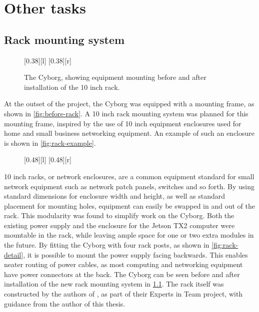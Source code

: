 \documentclass[\rootfolder/main.tex]{subfiles}
\begin{document}
\chapter{Other tasks}

\label{ch:other-tasks} %


\section{Rack mounting system}

\begin{figure}[h]
    \centering
    [0.38\columnwidth][l]{}
    [0.38\columnwidth][r]{}
    \caption{The Cyborg, showing equipment mounting before and after installation of the 10 inch rack.\label{fig:before-after-rack}}
\end{figure}

At the outset of the project, the Cyborg was equipped with a mounting frame, as shown in \cref{fig:before-rack}.
A 10 inch rack mounting system was planned for this mounting frame, inspired by the use of 10 inch equipment enclosures used for home and small business networking equipment.
An example of such an enclosure is shown in \cref{fig:rack-example}.

\begin{figure}[h]
    [0.48\columnwidth][l]{}
    [0.48\columnwidth][r]{}
\end{figure}

10 inch racks, or network enclosures, are a common equipment standard for small network equipment such as network patch panels, switches and so forth.
By using standard dimensions for enclosure width and height, as well as standard placement for mounting holes, equipment can easily be swapped in and out of the rack.
This modularity was found to simplify work on the Cyborg. 
Both the existing power supply and the enclosure for the Jetson TX2 computer were mountable in the rack, while leaving ample space for one or two extra modules in the future.
By fitting the Cyborg with four rack posts, as shown in \cref{fig:rack-detail}, it is possible to mount the power supply facing backwards.
This enables neater routing of power cables, as most computing and networking equipment have power connectors at the back.
The Cyborg can be seen before and after installation of the new rack mounting system in \cref{fig:before-after-rack}.
The rack itself was constructed by the authors of \cite{Johansen2018}, as part of their Experts in Team project, with guidance from the author of this thesis.
\end{document}
